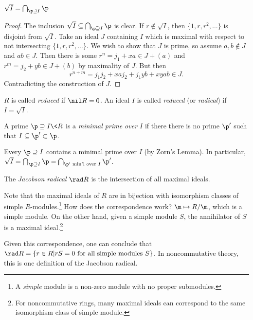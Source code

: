  \begin{lemma}
   $\sqrt{I} = \bigcap_{\p \supseteq I}\p$
 \end{lemma}
 \begin{proof}
   The inclusion $\sqrt I \subseteq \bigcap_{\p \supseteq I}\p$ is clear. If $r\not\in
   \sqrt{I}$, then $\{1,r,r^2,\dots\}$ is disjoint from $\sqrt I$. Take an ideal $J$
   containing $I$ which is maximal with respect to not intersecting $\{1,r,r^2,\dots\}$.
   We wish to show that $J$ is prime, so assume $a,b\not\in J$ and $ab\in J$. Then there
   is some $r^n= j_1 + xa \in J+(a)$ and $r^m = j_2+yb\in J+(b)$ by maximality of $J$.
   But then
   \[
    r^{n+m} = j_1j_2 + xaj_2 + j_1yb + xyab \in J.
   \]
   Contradicting the construction of $J$.
 \end{proof}
 \begin{definition}
   $R$ is called \emph{reduced} if $\nil R=0$. An ideal $I$ is called \emph{reduced} (or
   \emph{radical}) if $I=\sqrt I$.
 \end{definition}

 \begin{definition}
   A prime $\p\supseteq I\< R$ is a \emph{minimal prime over $I$} if there there is no
   prime $\p'$ such that $I\subseteq \p'\subset \p$.
 \end{definition}
 Every $\p\supseteq I$ contains a minimal prime over $I$ (by Zorn's Lemma). In
 particular, $\sqrt I = \bigcap_{\p\supseteq I}\p = \bigcap_{\p'\text{ min'l over } I}
 \p'$.

 \begin{definition}
   The \emph{Jacobson radical} $\rad R$ is the intersection of all maximal ideals.
 \end{definition}
 Note that the maximal ideals of $R$ are in bijection with isomorphism classes of simple
 $R$-modules.\footnote{A \emph{simple} module is a non-zero module with no proper
 submodules.} How does the correspondence work? $\m\mapsto R/\m$, which is a simple
 module. On the other hand, given a simple module $S$, the annihilator of $S$ is a
 maximal ideal.\footnote{For noncommutative rings, many maximal ideals can correspond to
 the same isomorphism class of simple module.}

 Given this correspondence, one can conclude that $\rad R = \{r\in R| rS=0 \text{ for all
 simple modules } S\}$. In noncommutative theory, this is one definition of the Jacobson
 radical.

